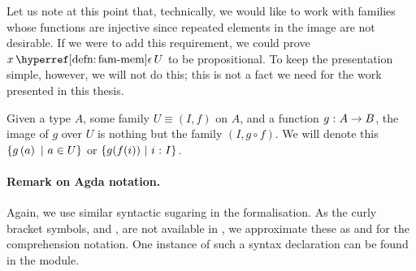Let us note at this point that, technically, we would like to work with families whose
functions are injective since repeated elements in the image are not desirable. If we were
to add this requirement, we could prove $\memfam{x}{U}$ to be propositional. To keep the
presentation simple, however, we will not do this; this is not a fact we need for the work
presented in this thesis.

\begin{defn}\label{defn:fam-img}
  Given a type $A$, some family $U \equiv (I, f)$ on $A$, and a function $g\hspace{0.1mm}:\hspace{0.1mm}A \rightarrow B$,
  the image of $g$ over $U$ is nothing but the family $(I, g \circ f)$. We will denote this
  $\left\{  g\left( a \right) ~|~ a \in U  \right\}$ or $\left\{  g(f(i)) ~|~ i\hspace{0.1mm}:\hspace{0.1mm}I  \right\}$.
\end{defn}

\paragraph*{Remark on Agda notation.}
Again, we use similar syntactic sugaring in the \veragda{} formalisation. As the curly
bracket symbols, \fnname{\{} and \fnname{\}}, are not available in \veragda{}, we
approximate these as \fnname{\textlquill} and \fnname{\textrquill} for the comprehension notation. One
instance of such a syntax declaration can be found in the  module.


